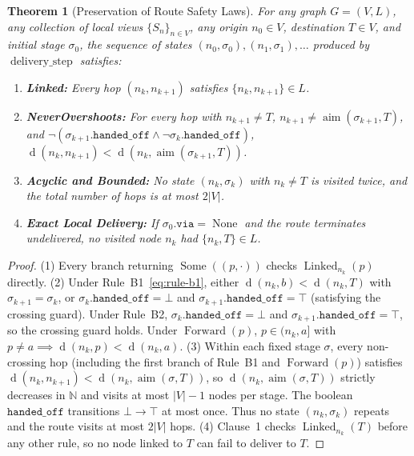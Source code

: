 \documentclass[journal]{IEEEtran}
\newtheorem{theorem}{Theorem}
\newcommand{\dist}{\operatorname{d}}
\newcommand{\Linked}{\operatorname{Linked}}
\newcommand{\Aim}{\operatorname{aim}}
\begin{document}
\begin{theorem}[Preservation of Route Safety Laws]
\label{theorem:route-safety}
For any graph $G = (V, L)$, any collection of local views $\{S_n\}_{n \in V}$,
any origin $n_0 \in V$, destination $T \in V$, and initial stage $\sigma_0$, the
sequence of states $(n_0, \sigma_0), (n_1, \sigma_1), \dots$ produced by
$\operatorname{delivery\_step}$ satisfies:
\begin{enumerate}
  \item \textbf{Linked:} Every hop $(n_k, n_{k+1})$ satisfies $\{n_k, n_{k+1}\} \in L$.
  \item \textbf{NeverOvershoots:} For every hop with $n_{k+1} \neq T$,
  $n_{k+1} \neq \Aim(\sigma_{k+1}, T)$, and
  $\neg(\sigma_{k+1}.\texttt{handed\_off} \land \neg\sigma_k.\texttt{handed\_off})$,
  $\dist(n_k, n_{k+1}) < \dist(n_k, \Aim(\sigma_{k+1}, T))$.
  \item \textbf{Acyclic and Bounded:} No state $(n_k, \sigma_k)$ with $n_k \neq T$
  is visited twice, and the total number of hops is at most $2|V|$.
  \item \textbf{Exact Local Delivery:} If $\sigma_0.\texttt{via} = \operatorname{None}$
  and the route terminates undelivered, no visited node $n_k$ had $\{n_k, T\} \in L$.
\end{enumerate}
\end{theorem}
\begin{proof}
(1) Every branch returning $\operatorname{Some}((p, \cdot))$ checks $\Linked_{n_k}(p)$
directly.
(2) Under Rule~B1~\eqref{eq:rule-b1}, either $\dist(n_k, b) < \dist(n_k, T)$ with
$\sigma_{k+1} = \sigma_k$, or $\sigma_k.\texttt{handed\_off} = \bot$ and
$\sigma_{k+1}.\texttt{handed\_off} = \top$ (satisfying the crossing guard). Under
Rule~B2, $\sigma_k.\texttt{handed\_off} = \bot$ and
$\sigma_{k+1}.\texttt{handed\_off} = \top$, so the crossing guard holds. Under
$\operatorname{Forward}(p)$, $p \in (n_k, a]$ with $p \neq a \implies
\dist(n_k, p) < \dist(n_k, a)$.
(3) Within each fixed stage $\sigma$, every non-crossing hop (including the first
branch of Rule~B1 and $\operatorname{Forward}(p)$) satisfies
$\dist(n_k, n_{k+1}) < \dist(n_k, \Aim(\sigma, T))$, so $\dist(n_k, \Aim(\sigma, T))$
strictly decreases in $\mathbb{N}$ and visits at most $|V|-1$ nodes per stage.
The boolean $\texttt{handed\_off}$ transitions $\bot \to \top$ at most once.
Thus no state $(n_k, \sigma_k)$ repeats and the route visits at most $2|V|$ hops.
(4) Clause~1 checks $\Linked_{n_k}(T)$ before any other rule, so no node linked
to $T$ can fail to deliver to $T$.
\end{proof}
\end{document}
